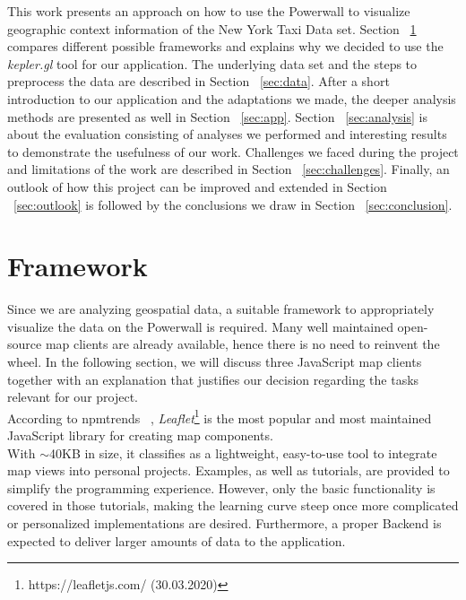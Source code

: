 \documentclass[sigconf, authorversion, nonacm=true]{acmart}
\begin{document}
This work presents an approach on how to use the Powerwall to visualize geographic context information of the New York Taxi Data set. Section ~\ref{sec:framework} compares different possible frameworks and explains why we decided to use the \textit{kepler.gl} tool for our application. The underlying data set and the steps to preprocess the data are described in Section ~\ref{sec:data}. After a short introduction to our application and the adaptations we made, the deeper analysis methods are presented as well in Section ~\ref{sec:app}. Section ~\ref{sec:analysis} is about the evaluation consisting of analyses we performed and interesting results to demonstrate the usefulness of our work. Challenges we faced during the project and limitations of the work are described in Section ~\ref{sec:challenges}. Finally, an outlook of how this project can be improved and extended in Section ~\ref{sec:outlook} is followed by the conclusions we draw in Section ~\ref{sec:conclusion}.





\section{Framework}
\label{sec:framework}

Since we are analyzing geospatial data, a suitable framework to appropriately visualize the data on the Powerwall is required. 
Many well maintained open-source map clients are already available, 
hence there is no need to reinvent the wheel. In the following section, we will discuss three JavaScript map clients together with an explanation that justifies our decision regarding the tasks relevant for our project.\\

According to npmtrends ~\citep{npmtrends}, \textit{Leaflet}\footnote{https://leafletjs.com/ (30.03.2020)} is the most popular and most maintained JavaScript library for creating map components.\\
With $\sim$40KB in size, it classifies as a lightweight, easy-to-use tool to integrate map views into personal projects. Examples, as well as tutorials, are provided to simplify the programming experience. However, only the basic functionality is covered in those tutorials, making the learning curve steep once more complicated or personalized implementations are desired. Furthermore, a proper Backend is expected to deliver larger amounts of data to the application.\\
\end{document}
